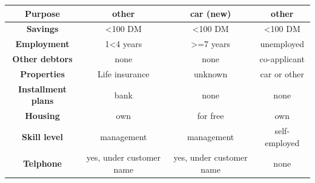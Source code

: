 \documentclass[preprint,12pt]{elsarticle}
\begin{document}
\begin{table}
{\begin{tabular}{|c|c|c|c|}
		\textbf{Purpose}                                         & other                      & car (new)                                                                            & other                                                                                \\ \hline
		\textbf{Savings}                                         & \textless{}100 DM          & \textless{}100 DM                                                                    & \textless{}100 DM                                                                    \\ \hline
		\textbf{Employment}                                      & 1\textless{}4 years        & \textgreater{}=7 years                                                               & unemployed                                                                           \\ \hline
		\textbf{Other debtors}                                   & none                       & none                                                                                 & co-applicant                                                                         \\ \hline
		\textbf{Properties}                                      & Life insurance             & unknown                                                                              & car or other                                                                         \\ \hline
		\textbf{Installment plans}                               & bank                       & none                                                                                 & none                                                                                 \\ \hline
		\textbf{Housing}                                         & own                        & for free                                                                             & own                                                                                  \\ \hline
		\textbf{Skill level}                                     & management                 & management                                                                           & self-employed                                                                        \\ \hline
		\textbf{Telphone}                                        & yes,   under customer name & yes,   under customer name                                                           & none                                                                                 \\ \hline

\end{tabular}}
\end{table}
\end{document}
